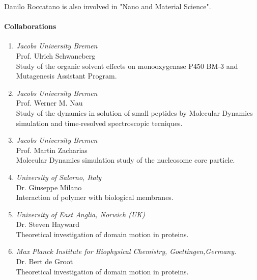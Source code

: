 \nocite{Pal06,Roccatano06b,Sahoo06}

Danilo Roccatano is also involved in "Nano and Material Science".


\paragraph{Collaborations}
\begin{enumerate}
\item {\sl Jacobs University Bremen} \\ Prof. Ulrich Schwaneberg \\ Study of 
the organic solvent effects on
monooxygenase P450 BM-3 and Mutagenesis Assistant Program.
\item {\sl Jacobs University Bremen} \\ Prof. Werner M. Nau \\ Study of the 
dynamics in solution of small 
peptides by Molecular Dynamics simulation and time-resolved spectroscopic 
tecniques.
\item {\sl Jacobs University Bremen} \\ Prof. Martin Zacharias \\ Molecular 
Dynamics simulation study of the nucleosome core particle.
\item {\sl University of Salerno, Italy} \\ Dr. Giuseppe Milano \\ Interaction of 
polymer with biological membranes.
\item {\sl University of East Anglia, Norwich (UK)} \\ Dr. Steven Hayward \\ Theoretical 
investigation of domain motion in proteins.
\item {\sl Max Planck Institute for Biophysical Chemistry, Goettingen,Germany. } \\ 
Dr. Bert de Groot \\ Theoretical investigation of domain motion in proteins.
\end{enumerate}


